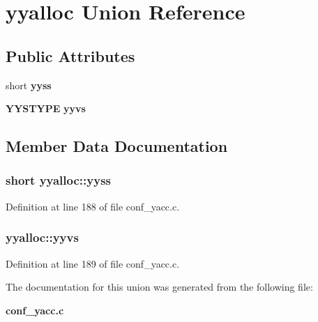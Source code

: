 \section{yyalloc Union Reference}
\label{unionyyalloc}
\subsection*{Public Attributes}
\begin{CompactItemize}
\item 
short {\bf yyss}
\item 
{\bf YYSTYPE} {\bf yyvs}
\end{CompactItemize}


\subsection{Member Data Documentation}
\subsubsection{\setlength{\rightskip}{0pt plus 5cm}short {\bf yyalloc::yyss}}\label{unionyyalloc_o0}




Definition at line 188 of file conf\_\-yacc.c.
\subsubsection{ {\bf yyalloc::yyvs}}\label{unionyyalloc_o1}




Definition at line 189 of file conf\_\-yacc.c.

The documentation for this union was generated from the following file:\begin{CompactItemize}
\item 
{\bf conf\_\-yacc.c}\end{CompactItemize}
